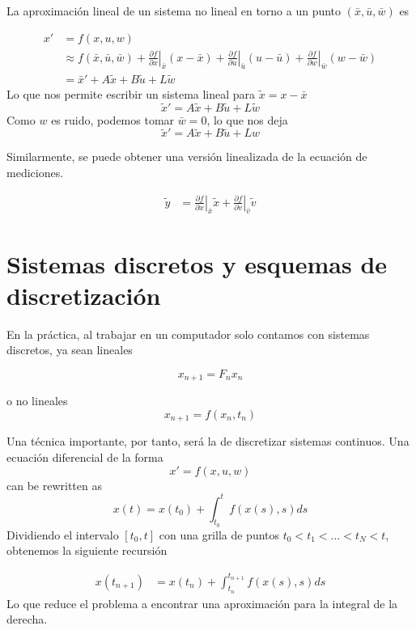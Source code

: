 La aproximación lineal de un sistema no lineal en torno a un punto \( (\bar{x}, \bar{u}, \bar{w})\) es 

\[
\begin{aligned}
x'  &= f(x,u,w) \\
    & \approx f(\bar{x}, \bar{u}, \bar{w}) + \left.\frac{\partial f}{\partial x} \right|_{\bar{x}}(x-\bar{x}) +
    \left.\frac{\partial f}{\partial u} \right|_{\bar{u}}(u-\bar{u}) + 
    \left.\frac{\partial f}{\partial w} \right|_{\bar{w}}(w-\bar{w}) \\
    &= \bar{x}' + A\tilde{x} + B\tilde{u} + L\tilde{w}
\end{aligned}
\]
Lo que nos permite escribir un sistema lineal para \(\tilde{x} = x - \bar{x}\)
\[
\tilde{x}' = A\tilde{x} + B \tilde{u} + L \tilde{w}
\]
Como \(w\) es ruido, podemos tomar \(\bar{w}=0\), lo que nos deja 
\[
\tilde{x}' = A\tilde{x} + B \tilde{u} + L w
\]

Similarmente, se puede obtener una versión linealizada de la ecuación de mediciones.

\[
\begin{aligned}
\tilde{y} &= \left. \frac{\partial f}{\partial x} \right|_{\bar{x}} \tilde{x} + \left. \frac{\partial f}{\partial v} \right|_{\bar{v}} \tilde{v}
\end{aligned}
\]


\section{Sistemas discretos y esquemas de discretización}

En la práctica, al trabajar en un computador solo contamos con sistemas discretos, ya sean lineales

\[
x_{n+1} = F_n x_n
\]

o no lineales 
\[
x_{n+1} = f(x_n, t_n)
\]

Una técnica importante, por tanto, será la de discretizar sistemas continuos. Una ecuación diferencial de la forma 
\[
x' = f(x,u,w) 
\]
can be rewritten as 
\[
x(t) = x(t_0) + \int_{t_0}^{t} f(x(s), s) ds
\]
Dividiendo el intervalo \([t_0, t]\) con una grilla de puntos \(t_0 < t_1 < \dots < t_N < t\), obtenemos la siguiente recursión 

\[
\begin{aligned}
x(t_{n+1}) &= x(t_n) + \int_{t_n}^{t_{n+1}} f(x(s), s) ds
\end{aligned}
\]
Lo que reduce el problema a encontrar una aproximación para la integral de la derecha. 

